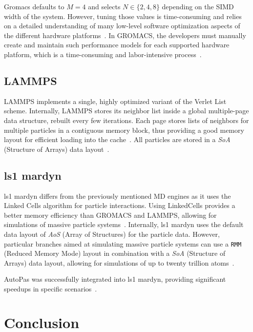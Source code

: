 \documentclass[conference]{IEEEtran}
\begin{document}
Gromacs defaults to $M=4$ and selects $N \in \{2, 4, 8\}$ depending on the SIMD width of the system. However, tuning those values is time-consuming and relies on a detailed understanding of many low-level software optimization aspects of the different hardware platforms~\cite{PALL20132641}. In GROMACS, the developers must manually create and maintain such performance models for each supported hardware platform, which is a time-consuming and labor-intensive process~\cite{PALL20132641}.

\subsection{LAMMPS}

LAMMPS implements a single, highly optimized variant of the Verlet List scheme. Internally, LAMMPS stores its neighbor list inside a global multiple-page data structure, rebuilt every few iterations. Each page stores lists of neighbors for multiple particles in a contiguous memory block, thus providing a good memory layout for efficient loading into the cache~\cite{THOMPSON2022108171}. All particles are stored in a \textit{SoA} (Structure of Arrays) data layout~\cite{THOMPSON2022108171}.

\subsection{ls1 mardyn}

ls1 mardyn differs from the previously mentioned MD engines as it uses the Linked Cells algorithm for particle interactions. Using LinkedCells provides a better memory efficiency than GROMACS and LAMMPS, allowing for simulations of massive particle systems~\cite{tchipev2019twe}. Internally, ls1 mardyn uses the default data layout of \textit{AoS} (Array of Structures) for the particle data. However, particular branches aimed at simulating massive particle systems can use a \texttt{RMM} (Reduced Memory Mode) layout in combination with a \textit{SoA} (Structure of Arrays) data layout, allowing for simulations of up to twenty trillion atoms~\cite{tchipev2019twe}.

AutoPas was successfully integrated into ls1 mardyn, providing significant speedups in specific scenarios~\cite{SECKLER2021101296}.


\section{Conclusion}
\end{document}
